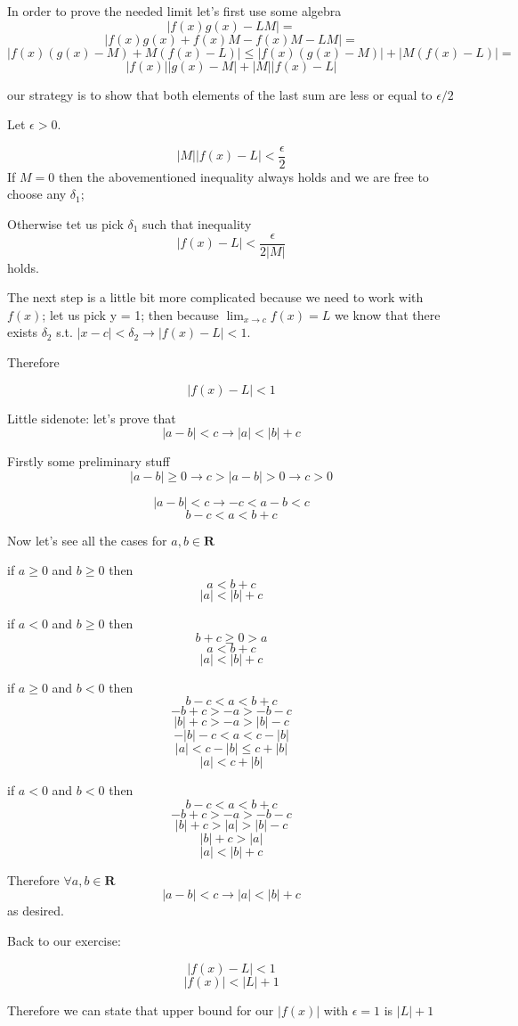 \documentclass[11pt,oneside,titlepage]{book}
\begin{document}
In  order to prove the needed limit let's first use some algebra
$$ |f(x)g(x) - LM| = $$
$$ |f(x)g(x) + f(x)M - f(x)M - LM| = $$
$$|f(x)(g(x) - M) + M(f(x) - L)| \leq
|f(x)(g(x) - M)| + | M(f(x) - L)| = $$
$$|f(x)||g(x) - M| + |M||f(x) - L|  $$

our strategy is to show that both elements of the last sum are less or equal to $\epsilon/2$

Let $\epsilon > 0$.

$$ |M||f(x) - L| < \frac{\epsilon}{2}$$
If $M = 0$ then the abovementioned inequality always holds and we are free to choose any $\delta_1$;

Otherwise tet us pick $\delta_1$ such that inequality
$$ |f(x) - L| < \frac{\epsilon}{2|M|}$$
holds.

The next step is a little bit more complicated because we need to work with $f(x)$; let us pick y = 1;
then because $\lim_{x \to c}f(x) = L$ we know that there exists $\delta_2$ s.t. $|x - c| < \delta_2
\to |f(x) - L| < 1$. 

Therefore

$$|f(x) - L| < 1$$

Little sidenote: let's prove that 
$$ |a - b| < c \to |a| < |b| + c  $$

Firstly some preliminary stuff
$$|a - b| \geq 0 \to c > |a - b| > 0 \to c > 0$$

$$|a - b| < c \to -c < a - b < c$$
$$b -c < a  < b + c$$

Now let's see all the cases for $a, b \in \textbf{R}$

if $a \geq 0$ and $b \geq 0$ then
$$a < b + c$$
$$|a| < |b| + c$$

if $a < 0$ and $b \geq 0$ then
$$ b + c \geq 0 > a$$
$$a < b + c$$
$$|a| < |b| + c$$

if $a \geq 0$ and $b < 0$ then
$$b -c < a  < b + c$$
$$-b +c > -a  > -b - c$$
$$|b| +c > -a  > |b| - c$$
$$-|b| - c  < a  <  c - |b|$$
$$|a|  <  c - |b| \leq c + |b|$$
$$|a|  <  c + |b|$$

if $a < 0$ and $b < 0$ then
$$b -c < a  < b + c$$
$$-b + c > -a  > -b - c$$
$$|b| + c > |a|  > |b| - c$$
$$|b| + c > |a|$$
$$|a| < |b| + c$$

Therefore $\forall a,b\in \textbf{R}$
$$|a - b| < c \to |a| < |b| + c$$
as desired.

Back to our exercise: 

$$|f(x) - L| < 1$$
$$|f(x)| < |L| + 1$$

Therefore we can state that upper bound for our $|f(x)|$ with $\epsilon = 1$ is $|L| + 1$
\end{document}
